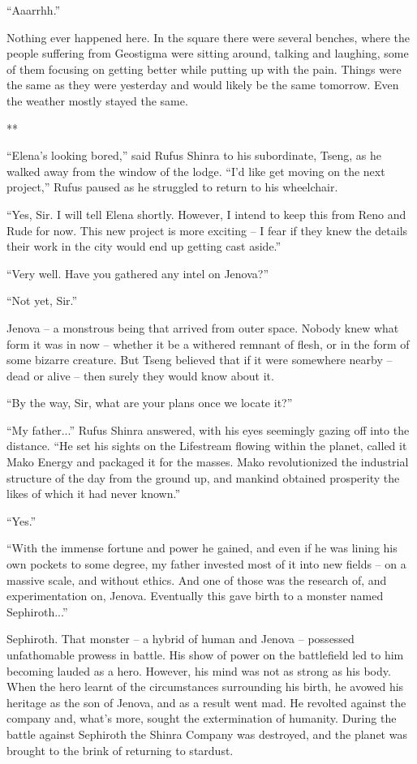 \documentclass[oneside]{book}
\begin{document}
“Aaarrhh.”

Nothing ever happened here. In the square there were several benches, where the people suffering from Geostigma were sitting around, talking and laughing, some of them focusing on getting better while putting up with the pain. Things were the same as they were yesterday and would likely be the same tomorrow. Even the weather mostly stayed the same.

**

“Elena’s looking bored,” said Rufus Shinra to his subordinate, Tseng, as he walked away from the window of the lodge. “I’d like get moving on the next project,” Rufus paused as he struggled to return to his wheelchair.

“Yes, Sir. I will tell Elena shortly. However, I intend to keep this from Reno and Rude for now. This new project is more exciting – I fear if they knew the details their work in the city would end up getting cast aside.”

“Very well. Have you gathered any intel on Jenova?”

“Not yet, Sir.”

Jenova – a monstrous being that arrived from outer space. Nobody knew what form it was in now – whether it be a withered remnant of flesh, or in the form of some bizarre creature. But Tseng believed that if it were somewhere nearby – dead or alive – then surely they would know about it.

“By the way, Sir, what are your plans once we locate it?”

“My father...” Rufus Shinra answered, with his eyes seemingly gazing off into the distance. “He set his sights on the Lifestream flowing within the planet, called it Mako Energy and packaged it for the masses. Mako revolutionized the industrial structure of the day from the ground up, and mankind obtained prosperity the likes of which it had never known.”

“Yes.”

“With the immense fortune and power he gained, and even if he was lining his own pockets to some degree, my father invested most of it into new fields – on a massive scale, and without ethics. And one of those was the research of, and experimentation on, Jenova. Eventually this gave birth to a monster named Sephiroth...”

Sephiroth. That monster – a hybrid of human and Jenova – possessed unfathomable prowess in battle. His show of power on the battlefield led to him becoming lauded as a hero. However, his mind was not as strong as his body. When the hero learnt of the circumstances surrounding his birth, he avowed his heritage as the son of Jenova, and as a result went mad. He revolted against the company and, what’s more, sought the extermination of humanity. During the battle against Sephiroth the Shinra Company was destroyed, and the planet was brought to the brink of returning to stardust.
\end{document}
